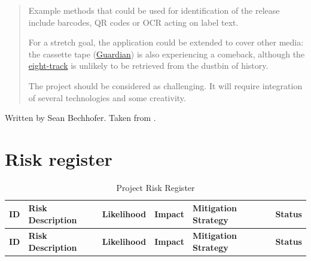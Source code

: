 \begin{uomappendix}
\begin{quote}
                Example methods that could be used for identification of the release include barcodes, QR codes or OCR acting on label text.
                
                For a stretch goal, the application could be extended to cover other media: the cassette tape (\href{https://www.theguardian.com/music/2023/apr/20/fun-way-consume-music-why-sales-of-cassette-tapes-soaring}{Guardian}) is also experiencing a comeback, although the \href{https://en.wikipedia.org/wiki/8-track_cartridge}{eight-track} is unlikely to be retrieved from the dustbin of history.
                
                The project should be considered as challenging. It will require integration of several technologies and some creativity.
            \end{quote}
    
            Written by Sean Bechhofer. Taken from \cite{bechhofervttspec}.
        
        \section{Risk register}
            
            \begin{longtable}{|c|p{3.2cm}|c|c|p{4.1cm}|p{3.0cm}|}
                \caption{Project Risk Register} \label{tab:riskRegister} \\
                
                \hline
                \textbf{ID} & \textbf{Risk Description} & \textbf{Likelihood} & \textbf{Impact} & \textbf{Mitigation Strategy} & \textbf{Status} \\ \hline
                \endfirsthead
                
                \hline
                \textbf{ID} & \textbf{Risk Description} & \textbf{Likelihood} & \textbf{Impact} & \textbf{Mitigation Strategy} & \textbf{Status} \\ \hline
                \endhead
    

\end{longtable}
\end{uomappendix}
